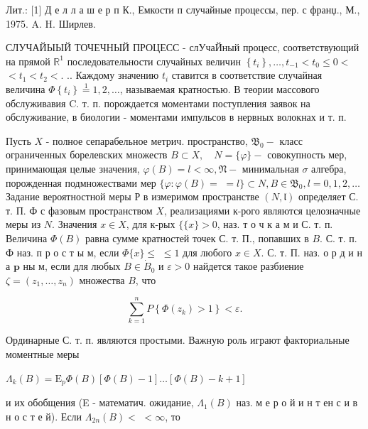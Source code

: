 \documentclass[10pt]{article}
\begin{document}
Лит.: [1] Д е л л а ш е р п К., Емкости п случайные процессы, пер. с франџ., М., 1975. A. H. Ширлев.



СЛУЧАЙЫЫЙ ТОЧЕЧНЫЙ ПРОЦЕСС - слУчаЙный процесс, соответствующий на прямой $\mathbb{R}^{1}$ последовательности случайных величин $\left\{t_{i}\right\}, \ldots, t_{-1}<t_{0} \leqslant 0<$ $<t_{1}<t_{2}<$. .. Каждому значению $t_{i}$ ставится в соответствие случайная величина $\Phi\left\{t_{i}\right\} \stackrel{1}{=} 1,2, \ldots$, называемая кратностью. В теории массового обслуживавия C. т. п. порождается моментами поступления заявок на обслуживание, в биологии - моментами импульсов в нервных волокнах и т. п.



Пусть $X$ - полное сепарабельное метрич. пространство, $\mathfrak{B}_{0}-$ класс ограниченных борелевских множеств $B \subset X, \quad N=\{\varphi\}-$ совокупность мер, принимающая целые значения, $\varphi(B)=l<\infty, \mathfrak{N}-$ минимальная $\sigma$ алгебра, порожденная подмножествами мер $\{\varphi: \varphi(B)=$ $=l\} \subset N, B \in \mathfrak{B}_{0}, l=0,1,2, \ldots$ Задание вероятностной меры Р в измеримом пространстве $(N, \mathfrak{l})$ определяет С. т. П. Ф с фазовым пространством $X$, реализациями к-рого являются целозначные меры из $N$. Значения $x \in X$, для к-рых $\{\{x\}>0$, наз. т о ч к а м и С. т. п. Величина $\Phi(B)$ равна сумме кратностей точек С. т. П., попавших в $B$. С. т. п. Ф наз. п р о с т ы м, если $\Phi\{x\} \leqslant$ $\leqslant 1$ для любого $x \in X$. С. т. П. наз. о р д и н а $\mathbf{p}$ ны м, если для любых $B \in \dot{B}_{0}$ и $\varepsilon>0$ найдется такое разбиение $\zeta=\left(z_{1}, \ldots, z_{n}\right)$ множества $B$, что



\[

\sum_{k=1}^{n} P\left\{\Phi\left(z_{k}\right)>1\right\}<\varepsilon .

\]



Ординарные С. т. п. являются простыми. Важную роль играют факториальные моментные меры



$\Lambda_{k}(B)=\mathrm{E}_{p} \Phi(B)[\Phi(B)-1] \ldots[\Phi(B)-k+1]$



и их обобщения (E - математич. ожидание, $\Lambda_{1}(B)$ наз. м е р о й и н т ен с и в н о с т е й). Если $\Lambda_{2 n}(B)<$ $<\infty$, то
\end{document}
